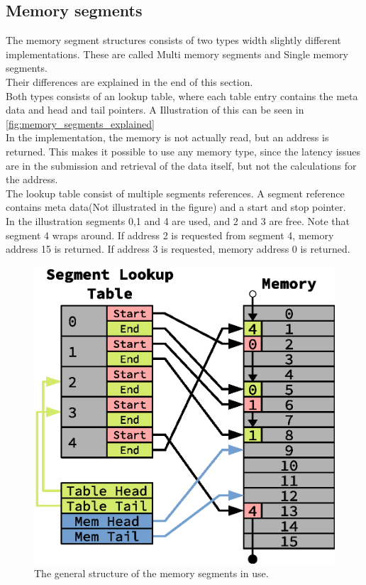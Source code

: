 \subsection{Memory segments} \label{subsec:memory_segments}
The memory segment structures consists of two types width slightly different
implementations. These are called Multi memory segments and Single memory
segments.
\\Their differences are explained in the end of this section.\\
Both types consists of an lookup table, where each table entry contains the
meta data and head and tail pointers. A Illustration of this can be seen in
\autoref{fig:memory_segments_explained}\\
In the implementation, the memory is not actually read, but an address is
returned. This makes it possible to use any memory type, since the latency issues
are in the submission and retrieval of the data itself, but not the calculations
for the address.\\
The lookup table consist of multiple segments references. A segment reference
contains meta data(Not illustrated in the figure) and a start and stop pointer.\\
In the illustration segments 0,1 and 4 are used, and 2 and 3 are free. Note that
segment 4 wraps around. If address 2 is requested from segment 4, memory address
15 is returned. If address 3 is requested, memory address 0 is returned.\\
\begin{figure}
	\centering
	\includegraphics[width=\linewidth]{implementation/memory_segments.eps}
	\caption{The general structure of the memory segments in use.}
	\label{fig:memory_segments_explained}
\end{figure}

